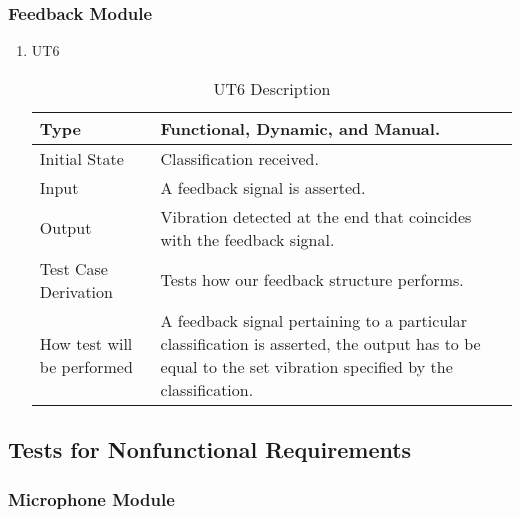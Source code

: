 \documentclass[12pt, titlepage]{article}
\begin{document}
\subsubsection{Feedback Module}

\begin{enumerate}

\item{UT6}
\begin{table}[H]
    \caption{UT6 Description}
\begin{tabular}{ |p{5cm}||p{7cm}| }
    \hline
    Type & Functional, Dynamic, and Manual. \\
    \hline
    Initial State  &  Classification received. \\
    \hline
    Input &   A feedback signal is asserted.  \\
    \hline
    Output &   Vibration detected at the end that coincides with the feedback signal.  \\
    \hline
    Test Case Derivation &   Tests how our feedback structure performs. \\
    \hline
    How test will be performed & A feedback signal pertaining to a particular classification is asserted, the output has to be equal to the set vibration specified by the classification. \\
    \hline
\end{tabular}
\end{table}
\end{enumerate}

\subsection{Tests for Nonfunctional Requirements}

\subsubsection{Microphone Module}
\end{document}
